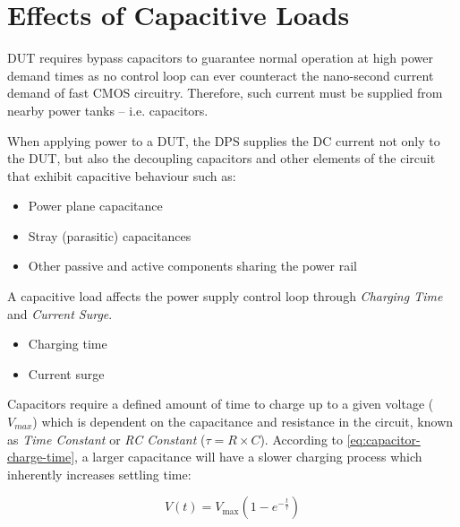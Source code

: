 


\section{Effects of Capacitive Loads}
\label{sec:capacitive-load-effects}

\ac{DUT} requires bypass capacitors to guarantee normal operation at
high power demand times as no control loop can ever counteract the nano-second
current demand of fast \ac{CMOS} circuitry.
Therefore, such current must be supplied from nearby power tanks – i.e.
capacitors.

When applying power to a \ac{DUT}, the \ac{DPS} supplies the \acs{DC}
current not only to the \ac{DUT}, but also the
decoupling capacitors and other elements of the circuit that
exhibit capacitive behaviour such as:

\begin{itemize}[topsep=8pt,itemsep=4pt,partopsep=4pt, parsep=4pt]
    \item Power plane capacitance
    \item Stray (parasitic) capacitances
    \item Other passive and active components sharing the power rail
\end{itemize}

A capacitive load affects the power supply control loop through
\emph{Charging Time} and \emph{Current Surge}.

\begin{itemize}[topsep=8pt,itemsep=4pt,partopsep=4pt, parsep=4pt]
    \item Charging time
    \item Current surge
\end{itemize}

Capacitors require a defined amount of time to charge up to a given voltage
($V_{max}$) which is dependent on the capacitance and resistance in
the circuit, known as \emph{Time Constant} or
\emph{RC Constant} ($\tau = {R \times C}$).
According to \autoref{eq:capacitor-charge-time}, a larger capacitance will have
a slower charging process which inherently increases settling time:

\begin{equation}
    \label{eq:capacitor-charge-time}
    V(t) = V_{\text{max}} \left(1 - e^{-\frac{t}{\tau}}\right)
\end{equation}

